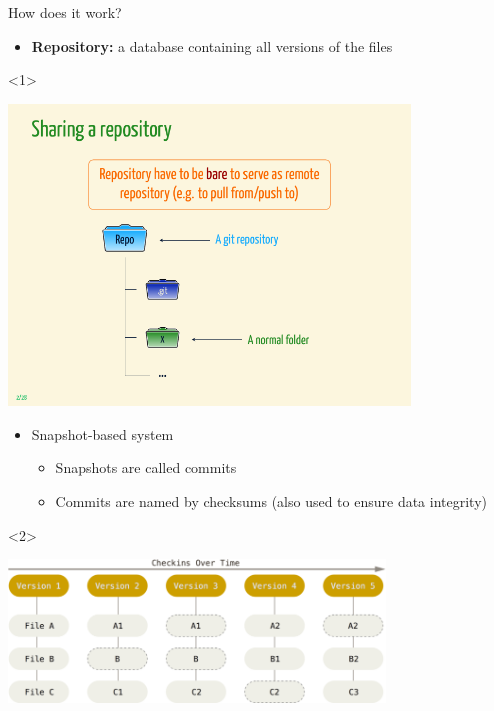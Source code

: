 \documentclass[usenames,svgnames,14pt]{beamer}
\begin{document}
\begin{frame}{How does it work?}
    \begin{overlayarea}{\textwidth}{0.75\textheight}
        \begin{itemize}
            \item \textbf{Repository:} a database containing all versions of the files
        \end{itemize}
        \begin{onlyenv}<1>
            \begin{center}
                \includegraphics[width=0.8\textwidth, clip, trim=2cm 6mm 2cm 36mm]{Repository}
            \end{center}
        \end{onlyenv}
        \begin{itemize}[<2->]
            \item Snapshot-based system
                  \begin{itemize}
                      \item Snapshots are called commits
                      \item Commits are named by checksums (also used to ensure data integrity)\\
                  \end{itemize}
        \end{itemize}
        \begin{onlyenv}<2>
            \begin{center}
                  \includegraphics[width=0.75\textwidth]{Snapshots}\\

\end{center}
\end{onlyenv}
\end{overlayarea}
\end{frame}
\end{document}

